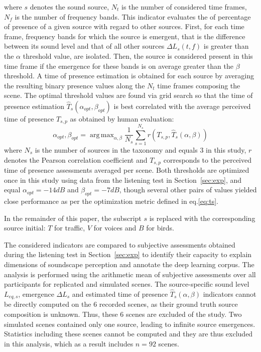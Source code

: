 \documentclass[twocolumn]{article}
\DeclareMathOperator*{\argmax}{arg\,max}
\begin{document}
where $s$ denotes the sound source, $N_t$ is the number of considered time frames, $N_f$ is the number of frequency bands. This indicator evaluates the of percentage of presence of a given source with regard to other sources. First, for each time frame, frequency bands for which the source is emergent, that is the difference between its sound level and that of all other sources $\Delta L_{s}(t, f)$ is greater than the $\alpha$ threshold value, are isolated. Then, the source is considered present in this time frame if the emergence for these bands is on average greater than the $\beta$ threshold. A time of presence estimation is obtained for each source by averaging the resulting binary presence values along the $N_t$ time frames composing the scene. The optimal threshold values are found via grid search so that the time of presence estimation $\hat T_s(\alpha_{opt}, \beta_{opt})$ is best correlated with the average perceived time of presence $T_{s, p}$ as obtained by human evaluation:
\begin{equation}\label{eq:ts_opt}
\alpha_{opt},\beta_{opt} = \argmax_{\alpha, \beta}\frac{1}{N_s}\sum_{s = 1}^{N_s}r\left(T_{s, p}, \hat T_s(\alpha, \beta)\right)
\end{equation}
where $N_s$ is the number of sources in the taxonomy and equals 3 in this study, $r$ denotes the Pearson correlation coefficient and $T_{s, p}$ corresponds to the perceived time of presence assessments averaged per scene. Both thresholds are optimized once in this study using data from the listening test in Section~\ref{sec:exp}, and equal $\alpha_{opt} = -14dB$ and $\beta_{opt} = -7dB$, though several other pairs of values yielded close performance as per the optimization metric defined in eq.\ref{eq:ts}.

In the remainder of this paper, the subscript $s$ is replaced with the corresponding source initial: $T$ for traffic, $V$ for voices and $B$ for birds.

The considered indicators are compared to subjective assessments obtained during the listening test in Section~\ref{sec:exp} to identify their capacity to explain dimensions of soundscape perception and annotate the deep learning corpus. The analysis is performed using the arithmetic mean of subjective assessments over all participants for replicated and simulated scenes. The source-specific sound level $L_{eq, s}$, emergence $\Delta L_{s}$ and estimated time of presence $\hat T_s(\alpha, \beta)$ indicators cannot be directly computed on the 6 recorded scenes, as their ground truth source composition is unknown. Thus, these 6 scenes are excluded of the study. Two simulated scenes contained only one source, leading to infinite source emergences. Statistics including these scenes cannot be computed and they are thus excluded in this analysis, which as a result includes $n=92$ scenes.
\end{document}
